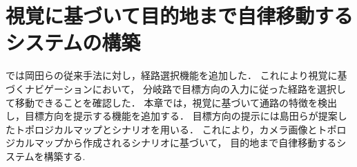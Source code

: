 \chapter{視覚に基づいて目的地まで自律移動するシステムの構築}
\label{chap:scenario_vision}
では岡田らの従来手法に対し，経路選択機能を追加した．
これにより視覚に基づくナビゲーションにおいて，
分岐路で目標方向の入力に従った経路を選択して移動できることを確認した．
本章では，視覚に基づいて通路の特徴を検出し，目標方向を提示する機能を追加する．
目標方向の提示には島田ら\cite{shimada2020}が提案したトポロジカルマップとシナリオを用いる．
これにより，カメラ画像とトポロジカルマップから作成されるシナリオに基づいて，
目的地まで自律移動するシステムを構築する.
%
%
%

\newpage

\newpage

\newpage

\newpage
